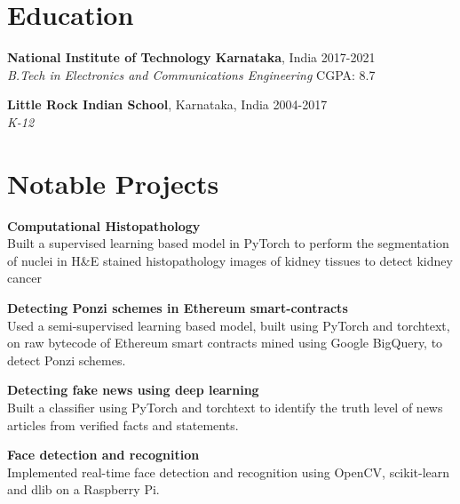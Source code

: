 \documentclass[margin]{res}
\begin{document}
  \address{National Institute of Technology\\
           Karnataka, India\\
           russel.171ec143@nitk.edu.in}
  \address{{\faMobile} (91+) 9611212081\\
           {\faLinkedin} \href{https://linkedin.com/in/rshwndsz}{linkedin.com/in/rshwndsz}\\
           {\faGithub} \href{https://github.com/rshwndsz}{github.com/rshwndsz}}


  \begin{resume}
    \section{Education}
      \textbf{National Institute of Technology Karnataka}, India\hfill
      2017-2021 \\
      {\sl B.Tech in Electronics and Communications Engineering}
      \hfill{CGPA: 8.7}

      \textbf{Little Rock Indian School}, Karnataka, India\hfill
      2004-2017 \\
      {\sl K-12}


    \section{Notable Projects}
      \par
      \textbf{Computational Histopathology}\\
      Built a supervised learning based model in PyTorch to perform the segmentation of nuclei in H\&E stained histopathology images of kidney tissues to detect kidney cancer

      \par
      \textbf{Detecting Ponzi schemes in Ethereum smart-contracts}\\
      Used a semi-supervised learning based model, built using PyTorch and torchtext, on raw bytecode of Ethereum smart contracts mined using Google BigQuery, to detect Ponzi schemes.

      \par
      \textbf{Detecting fake news using deep learning}\\
      Built a classifier using PyTorch and torchtext to identify the truth level of news articles from verified facts and statements.

      \par
      \textbf{Face detection and recognition}\\
      Implemented real-time face detection and recognition using OpenCV, scikit-learn and dlib on a Raspberry Pi.



\end{resume}
\end{document}
